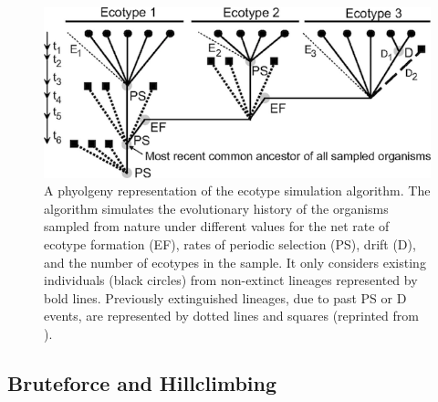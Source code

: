 \begin{figure}[h!]
  \centering
  \label{fig:SpeciationGraph}
   \includegraphics{images/Speciation-CH2}
   \caption[Detailed phylogeny with putative ecotype simulation events \protect\cite{koeppel2008identifying}.]{A phyolgeny representation of the ecotype simulation algorithm. The algorithm simulates the evolutionary history of the organisms sampled from nature under different values for the net rate of ecotype formation (EF), rates of periodic selection (PS), drift (D), and the number of ecotypes in the sample. It only considers existing individuals (black circles) from non-extinct lineages represented by bold lines. Previously extinguished lineages, due to past PS or D events, are represented by dotted lines and squares (reprinted from \protect\cite{koeppel2008identifying}).}
\end{figure}

\subsection*{Bruteforce and Hillclimbing}

